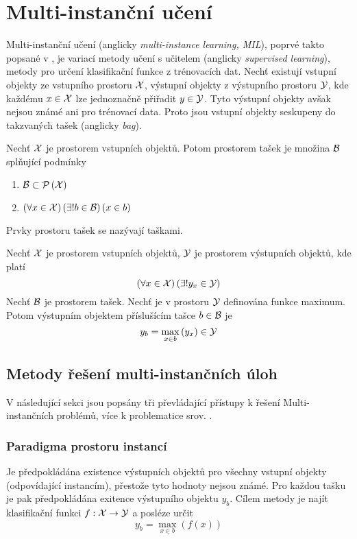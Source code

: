 \chapter{Multi-instanční učení}
Multi-instanční učení (anglicky \textenglish{\textit{multi-instance learning, MIL}}), poprvé takto popsané v \cite{dietterich_solving_1997}, je variací metody učení s učitelem (anglicky \textenglish{\textit{supervised learning}}), metody pro určení klasifikační funkce z trénovacích dat. Nechť existují vstupní objekty ze vstupního prostoru \( \mathcal X \), výstupní objekty z výstupního prostoru \( \mathcal Y \), kde každému \( x \in \mathcal X \) lze jednoznačně přiřadit \( y \in \mathcal Y \). Tyto výstupní objekty avšak nejsou známé ani pro trénovací data. Proto jsou vstupní objekty seskupeny do takzvaných tašek (anglicky \textenglish{\textit{bag}}).
\begin{define}
	Nechť \( \mathcal X \) je prostorem vstupních objektů. Potom prostorem tašek je množina \( \mathcal B \) splňující podmínky
	\begin{enumerate}
		\item \( \mathcal B \subset \mathcal P \left( \mathcal X \right) \)
		\item \( \left( \forall x \in \mathcal X \right) \left( \exists ! b \in \mathcal B \right) \left( x \in b \right) \)
	\end{enumerate}
	Prvky prostoru tašek se nazývají taškami.
\end{define}
\begin{define}\label{baglabel}
	Nechť \( \mathcal X \) je prostorem vstupních objektů, \( \mathcal Y \) je prostorem výstupních objektů, kde platí
	\[ \left( \forall x \in \mathcal X \right) \left( \exists ! y_x \in \mathcal Y \right) \]
	Nechť \( \mathcal B \) je prostorem tašek. Nechť je v prostoru \( \mathcal Y \) definována funkce maximum. Potom výstupním objektem příslušícím tašce \( b \in \mathcal B \) je
	\[ y_b = \max_{x \in b} \left( y_x \right) \in \mathcal Y \]
\end{define}

\section{Metody řešení multi-instančních úloh}

V následující sekci jsou popsány tři převládající přístupy k řešení Multi-instančních problémů, více k problematice srov. \cite{pevny_using_2016}.

\subsection{Paradigma prostoru instancí}
Je předpokládána existence výstupních objektů pro všechny vstupní objekty (odpovídající instancím), přestože tyto hodnoty nejsou známé. Pro každou tašku je pak předpokládána exitence výstupního objektu \( y_b \). Cílem metody je najít klasifikační funkci \( f : \mathcal X \to \mathcal Y \) a posléze určit
\begin{equation}
	y_b = \max_{x \in b} \left( f \left( x \right) \right)
\end{equation}

